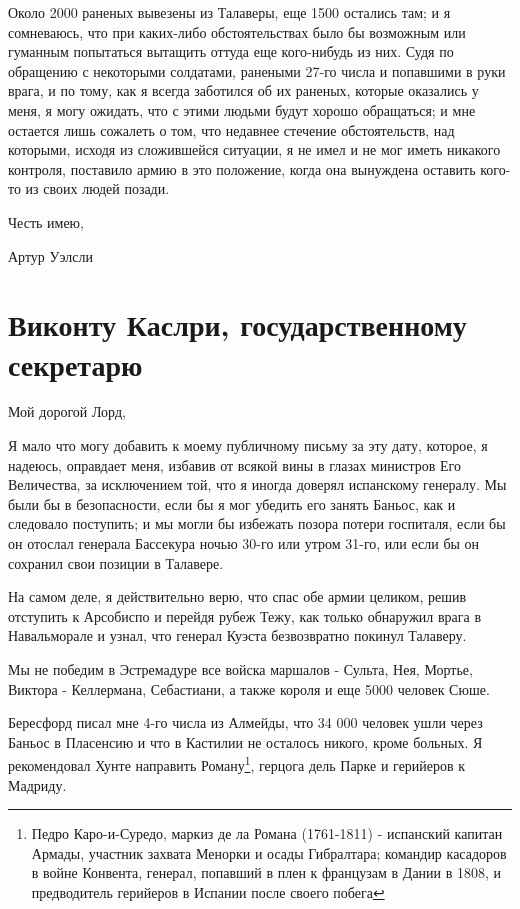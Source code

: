 \documentclass[
  oneside,
  12pt,
  titlepage]{book}
\begin{document}
Около 2000 раненых вывезены из Талаверы, еще 1500 остались там; и я сомневаюсь, что при каких-либо обстоятельствах было бы возможным или гуманным попытаться вытащить оттуда еще кого-нибудь из них. Судя по обращению с некоторыми солдатами, ранеными 27-го числа и попавшими в руки врага, и по тому, как я всегда заботился об их раненых, которые оказались у меня, я могу ожидать, что с этими людьми будут хорошо обращаться; и мне остается лишь сожалеть о том, что недавнее стечение обстоятельств, над которыми, исходя из сложившейся ситуации, я не имел и не мог иметь никакого контроля, поставило армию в это положение, когда она вынуждена оставить кого-то из своих людей позади.

Честь имею,

Артур Уэлсли

\hypertarget{ux432ux438ux43aux43eux43dux442ux443-ux43aux430ux441ux43bux440ux438-ux433ux43eux441ux443ux434ux430ux440ux441ux442ux432ux435ux43dux43dux43eux43cux443-ux441ux435ux43aux440ux435ux442ux430ux440ux44e-1}{%
\chapter{Виконту Каслри, государственному секретарю}\label{ux432ux438ux43aux43eux43dux442ux443-ux43aux430ux441ux43bux440ux438-ux433ux43eux441ux443ux434ux430ux440ux441ux442ux432ux435ux43dux43dux43eux43cux443-ux441ux435ux43aux440ux435ux442ux430ux440ux44e-1}}

Мой дорогой Лорд,

Я мало что могу добавить к моему публичному письму за эту дату, которое, я надеюсь, оправдает меня, избавив от всякой вины в глазах министров Его Величества, за исключением той, что я иногда доверял испанскому генералу. Мы были бы в безопасности, если бы я мог убедить его занять Баньос, как и следовало поступить; и мы могли бы избежать позора потери госпиталя, если бы он отослал генерала Бассекура ночью 30-го или утром 31-го, или если бы он сохранил свои позиции в Талавере.

На самом деле, я действительно верю, что спас обе армии целиком, решив отступить к Арсобиспо и перейдя рубеж Тежу, как только обнаружил врага в Навальморале и узнал, что генерал Куэста безвозвратно покинул Талаверу.

Мы не победим в Эстремадуре все войска маршалов - Сульта, Нея, Мортье, Виктора - Келлермана, Себастиани, а также короля и еще 5000 человек Сюше.

Бересфорд писал мне 4-го числа из Алмейды, что 34 000 человек ушли через Баньос в Пласенсию и что в Кастилии не осталось никого, кроме больных. Я рекомендовал Хунте направить Роману\footnote{Педро Каро-и-Суредо, маркиз де ла Романа (1761-1811) - испанский капитан Армады, участник захвата Менорки и осады Гибралтара; командир касадоров в войне Конвента, генерал, попавший в плен к французам в Дании в 1808, и предводитель герийеров в Испании после своего побега}, герцога дель Парке и герийеров к Мадриду.
\end{document}

